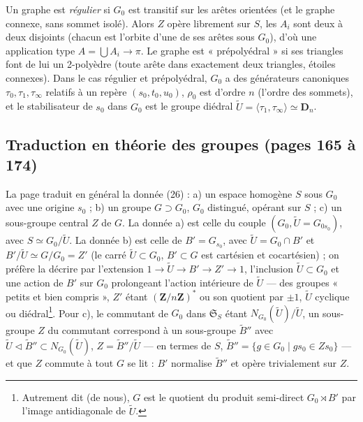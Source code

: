\documentclass[11pt,a4paper]{article}
\begin{document}
Un graphe est \emph{régulier} si $G_0$ est transitif sur les arêtes orientées
(et le graphe connexe, sans sommet isolé). Alors $Z$ opère librement sur $S$,
les $A_i$ sont deux à deux disjoints (chacun est l'orbite d'une de ses arêtes
sous $G_0$), d'où une application type $A = \bigcup A_i \to \pi$. Le graphe est
« prépolyédral » si ses triangles font de lui un 2-polyèdre (toute arête dans
exactement deux triangles, étoiles connexes). Dans le cas régulier et
prépolyédral, $G_0$ a des générateurs canoniques $\tau_0, \tau_1, \tau_\infty$
relatifs à un repère $(s_0, t_0, u_0)$, $\rho_0$ est d'ordre $n$ (l'ordre des
sommets), et le stabilisateur de $s_0$ dans $G_0$ est le groupe diédral
$\widetilde{U} = \langle \tau_1, \tau_\infty \rangle \simeq \mathbf{D}_n$.

\subsection*{Traduction en théorie des groupes (pages 165 à 174)}

La page traduit en général la donnée (26) : a) un espace homogène $S$ sous
$G_0$ avec une origine $s_0$ ; b) un groupe $G \supset G_0$, $G_0$ distingué,
opérant sur $S$ ; c) un sous-groupe central $Z$ de $G$. La donnée a) est celle
du couple $(G_0, \widetilde{U} = G_{0s_0})$, avec $S \simeq G_0/\widetilde{U}$.
La donnée b) est celle de $B' = G_{s_0}$, avec $\widetilde{U} = G_0 \cap B'$ et
$B'/\widetilde{U} \simeq G/G_0 = Z'$ (le carré $\widetilde{U} \subset G_0$,
$B' \subset G$ est cartésien et cocartésien) ; on préfère la décrire par
l'extension $1 \to \widetilde{U} \to B' \to Z' \to 1$, l'inclusion $\widetilde{U}
\subset G_0$ et une action de $B'$ sur $G_0$ prolongeant l'action intérieure de
$\widetilde{U}$ --- des groupes « petits et bien compris », $Z'$ étant
$(\mathbf{Z}/n\mathbf{Z})^{*}$ ou son quotient par $\pm 1$, $\widetilde{U}$
cyclique ou diédral\footnote{Autrement dit (de nous), $G$ est le quotient du
produit semi-direct $G_0 \rtimes B'$ par l'image antidiagonale de
$\widetilde{U}$.}. Pour c), le commutant de $G_0$ dans $\mathfrak{S}_S$ étant
$N_{G_0}(\widetilde{U})/\widetilde{U}$, un sous-groupe $Z$ du commutant
correspond à un sous-groupe $\widetilde{B}''$ avec $\widetilde{U} \triangleleft
\widetilde{B}'' \subset N_{G_0}(\widetilde{U})$, $Z = \widetilde{B}''/\widetilde{U}$
--- en termes de $S$, $\widetilde{B}'' = \{g \in G_0 \mid g s_0 \in Z s_0\}$ ---
et que $Z$ commute à tout $G$ se lit : $B'$ normalise $\widetilde{B}''$ et opère
trivialement sur $Z$.
\end{document}

